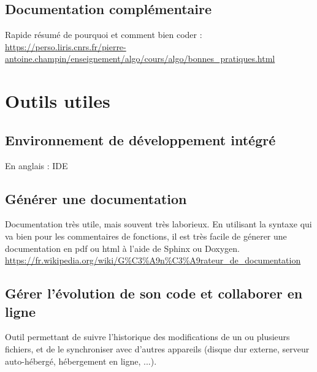 \documentclass{article}
\begin{document}
\subsection*{Documentation complémentaire}
Rapide résumé de pourquoi et comment bien coder :\\
\url{https://perso.liris.cnrs.fr/pierre-antoine.champin/enseignement/algo/cours/algo/bonnes_pratiques.html}




\section{Outils utiles}

\subsection*{Environnement de développement intégré}
En anglais : IDE

\subsection*{Générer une documentation}
Documentation très utile, mais souvent très laborieux. En utilisant la syntaxe qui va bien pour les commentaires de fonctions, il est très facile de génerer une documentation en pdf ou html à l'aide de Sphinx ou Doxygen.
\url{https://fr.wikipedia.org/wiki/G\%C3\%A9n\%C3\%A9rateur_de_documentation}
\subsection*{Gérer l'évolution de son code et collaborer en ligne}
Outil permettant de suivre l'historique des modifications de un ou plusieurs fichiers, et de le synchroniser avec d'autres appareils (disque dur externe, serveur auto-hébergé, hébergement en ligne, ...).
\end{document}
